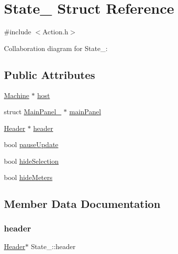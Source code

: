 \hypertarget{structState__}{}\section{State\+\_\+ Struct Reference}
\label{structState__}


{\ttfamily \#include $<$Action.\+h$>$}



Collaboration diagram for State\+\_\+\+:
\subsection*{Public Attributes}
\begin{DoxyCompactItemize}
\item 
\hyperlink{Machine_8h_aa3706f95e4706b9d02979efcabb1341d}{Machine} $\ast$ \hyperlink{structState___aee4f6aa93b6ebea62dd77104dd70e071}{host}
\item 
struct \hyperlink{structMainPanel__}{Main\+Panel\+\_\+} $\ast$ \hyperlink{structState___ac900533bf1f332c33e0b17e7112c78f7}{main\+Panel}
\item 
\hyperlink{linux_2download_2htop-3_83_80_2Header_8h_a7f4dfcf80c34406946a7bda3d88d5e36}{Header} $\ast$ \hyperlink{structState___ad3ba979c9f99f2ab9591eeaeabee621a}{header}
\item 
bool \hyperlink{structState___a7899d2f5312b465dfcee5ce310a1b6c9}{pause\+Update}
\item 
bool \hyperlink{structState___abdbdd43797680994c3efbcec998b371a}{hide\+Selection}
\item 
bool \hyperlink{structState___ae1a361b1c6850f2378b4aa851c7c7c3f}{hide\+Meters}
\end{DoxyCompactItemize}


\subsection{Member Data Documentation}
\mbox{\label{structState___ad3ba979c9f99f2ab9591eeaeabee621a}} 
\subsubsection{\texorpdfstring{header}{header}}
{\footnotesize\ttfamily \hyperlink{linux_2download_2htop-3_83_80_2Header_8h_a7f4dfcf80c34406946a7bda3d88d5e36}{Header}$\ast$ State\+\_\+\+::header}


